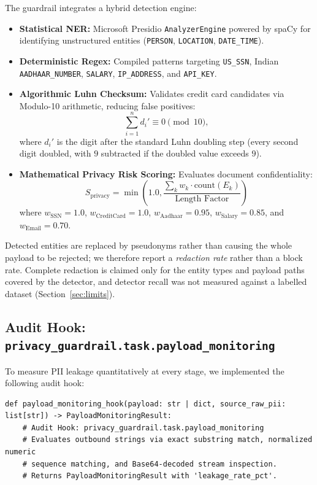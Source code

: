 \documentclass[11pt,a4paper]{article}
\begin{document}
The guardrail integrates a hybrid detection engine:
\begin{itemize}
    \item \textbf{Statistical NER:} Microsoft Presidio \texttt{AnalyzerEngine} powered by spaCy for identifying unstructured entities (\texttt{PERSON}, \texttt{LOCATION}, \texttt{DATE\_TIME}).
    \item \textbf{Deterministic Regex:} Compiled patterns targeting \texttt{US\_SSN}, Indian \texttt{AADHAAR\_NUMBER}, \texttt{SALARY}, \texttt{IP\_ADDRESS}, and \texttt{API\_KEY}.
    \item \textbf{Algorithmic Luhn Checksum:} Validates credit card candidates via Modulo-10 arithmetic, reducing false positives:
    \begin{equation}
    \sum_{i=1}^{n} d_i' \equiv 0 \pmod{10},
    \end{equation}
    where $d_i'$ is the digit after the standard Luhn doubling step (every second digit doubled, with $9$ subtracted if the doubled value exceeds $9$).
    \item \textbf{Mathematical Privacy Risk Scoring:} Evaluates document confidentiality:
    \begin{equation}
    S_{\text{privacy}} = \min\left(1.0, \frac{\sum_{k} w_k \cdot \text{count}(E_k)}{\text{Length Factor}}\right)
    \end{equation}
    where $w_{\text{SSN}} = 1.0$, $w_{\text{CreditCard}} = 1.0$, $w_{\text{Aadhaar}} = 0.95$, $w_{\text{Salary}} = 0.85$, and $w_{\text{Email}} = 0.70$.
\end{itemize}
Detected entities are replaced by pseudonyms rather than causing the whole payload to be rejected; we therefore report a \emph{redaction rate} rather than a block rate. Complete redaction is claimed only for the entity types and payload paths covered by the detector, and detector recall was not measured against a labelled dataset (Section~\ref{sec:limits}).

\subsection{Audit Hook: \texttt{privacy\_guardrail.task.payload\_monitoring}}
To measure PII leakage quantitatively at every stage, we implemented the following audit hook:
\begin{lstlisting}
def payload_monitoring_hook(payload: str | dict, source_raw_pii: list[str]) -> PayloadMonitoringResult:
    # Audit Hook: privacy_guardrail.task.payload_monitoring
    # Evaluates outbound strings via exact substring match, normalized numeric
    # sequence matching, and Base64-decoded stream inspection.
    # Returns PayloadMonitoringResult with 'leakage_rate_pct'.
\end{lstlisting}
\end{document}
